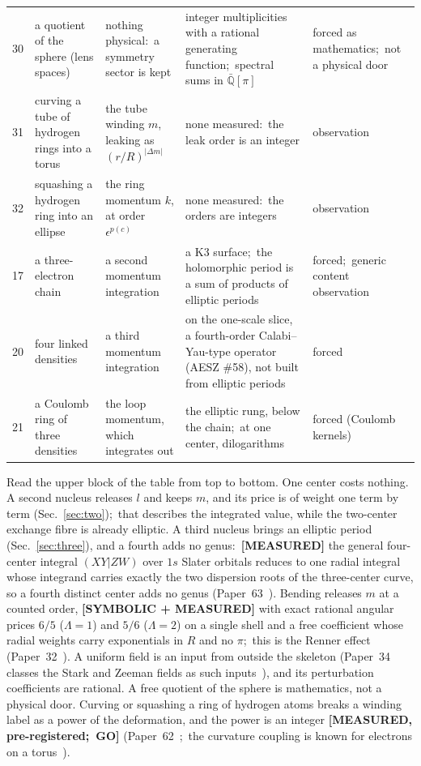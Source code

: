 \documentclass[aps,pra,twocolumn,superscriptaddress,longbibliography]{revtex4-2}
\begin{document}
\begin{table}[t]
\begin{tabular}{@{}rp{3.6cm}p{4.3cm}p{5.3cm}p{2.9cm}@{}}
30 & a quotient of the sphere (lens spaces) &
  nothing physical:\ a symmetry sector is kept &
  integer multiplicities with a rational generating function;\ spectral
  sums in $\bar{\mathbb{Q}}[\pi]$ & forced as mathematics;\ not a physical door \\
31 & curving a tube of hydrogen rings into a torus &
  the tube winding $m$, leaking as $(r/R)^{|\Delta m|}$ &
  none measured:\ the leak order is an integer & observation \\
32 & squashing a hydrogen ring into an ellipse &
  the ring momentum $k$, at order $\epsilon^{p(c)}$ &
  none measured:\ the orders are integers & observation \\
\midrule
17 & a three-electron chain &
  a second momentum integration &
  a K3 surface;\ the holomorphic period is a sum of products of elliptic
  periods & forced;\ generic content observation \\
20 & four linked densities &
  a third momentum integration &
  on the one-scale slice, a fourth-order Calabi--Yau-type operator (AESZ
  \#58), not built from elliptic periods & forced \\
21 & a Coulomb ring of three densities &
  the loop momentum, which integrates out &
  the elliptic rung, below the chain;\ at one center, dilogarithms &
  forced (Coulomb kernels) \\
\bottomrule
\end{tabular}
\end{table}

Read the upper block of the table from top to bottom.  One center costs
nothing.  A second nucleus releases $l$ and keeps $m$, and its price is
of weight one term by term (Sec.~\ref{sec:two});\ that describes the
integrated value, while the two-center exchange fibre is already
elliptic.  A third nucleus brings an elliptic period
(Sec.~\ref{sec:three}), and a fourth adds no genus:\
\textbf{[MEASURED]} the general four-center integral $(XY|ZW)$ over $1s$
Slater orbitals reduces to one radial integral whose integrand carries
exactly the two dispersion roots of the three-center curve, so a fourth
distinct center adds no genus (Paper~63~\cite{loutey_paper63}).  Bending
releases $m$ at a counted order, \textbf{[SYMBOLIC + MEASURED]} with
exact rational angular prices $6/5$ ($\Lambda=1$) and $5/6$
($\Lambda=2$) on a single shell and a free coefficient whose radial
weights carry exponentials in $R$ and no $\pi$;\ this is the Renner
effect~\cite{renner1934} (Paper~32~\cite{loutey_paper32}).  A uniform
field is an input from outside the skeleton (Paper~34 classes the Stark
and Zeeman fields as such inputs~\cite{loutey_paper34}), and its
perturbation coefficients are rational.  A free quotient of the sphere
is mathematics, not a physical door.  Curving or squashing a ring of
hydrogen atoms breaks a winding label as a power of the deformation, and
the power is an integer \textbf{[MEASURED, pre-registered;\ GO]}
(Paper~62~\cite{loutey_paper62};\ the curvature coupling is known for
electrons on a torus~\cite{encinosa2022}).
\end{document}
